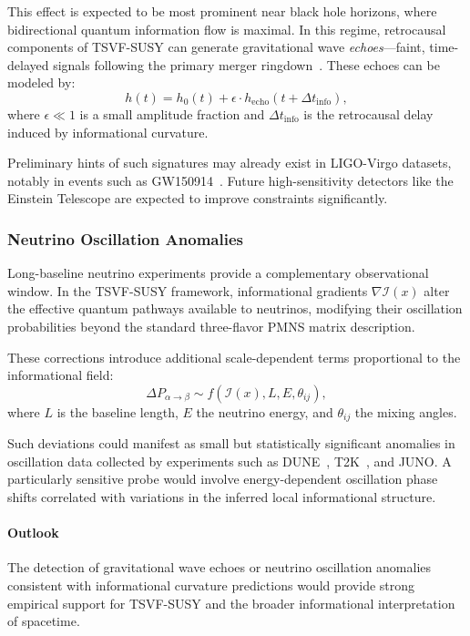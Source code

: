 \documentclass[twocolumn,superscriptaddress,floatfix]{revtex4-2}
\begin{document}
This effect is expected to be most prominent near black hole horizons, where bidirectional quantum information flow is maximal. In this regime, retrocausal components of TSVF-SUSY can generate gravitational wave \emph{echoes}—faint, time-delayed signals following the primary merger ringdown~\cite{Cardoso2016, Conklin2018}. These echoes can be modeled by:
\begin{equation}
h(t) = h_0(t) + \epsilon \cdot h_{\text{echo}}(t + \Delta t_{\text{info}}),
\label{eq:waveecho}
\end{equation}
where $\epsilon \ll 1$ is a small amplitude fraction and $\Delta t_{\text{info}}$ is the retrocausal delay induced by informational curvature.

Preliminary hints of such signatures may already exist in LIGO-Virgo datasets, notably in events such as GW150914~\cite{Abedi2017, Westerweck2018}. Future high-sensitivity detectors like the Einstein Telescope are expected to improve constraints significantly.

\subsubsection{Neutrino Oscillation Anomalies}

Long-baseline neutrino experiments provide a complementary observational window. In the TSVF-SUSY framework, informational gradients $\nabla \mathcal{I}(x)$ alter the effective quantum pathways available to neutrinos, modifying their oscillation probabilities beyond the standard three-flavor PMNS matrix description.

These corrections introduce additional scale-dependent terms proportional to the informational field:
\begin{equation}
\Delta P_{\alpha \rightarrow \beta} \sim f(\mathcal{I}(x), L, E, \theta_{ij}),
\end{equation}
where $L$ is the baseline length, $E$ the neutrino energy, and $\theta_{ij}$ the mixing angles.

Such deviations could manifest as small but statistically significant anomalies in oscillation data collected by experiments such as DUNE~\cite{DUNE2021}, T2K~\cite{T2K2020}, and JUNO. A particularly sensitive probe would involve energy-dependent oscillation phase shifts correlated with variations in the inferred local informational structure.

\paragraph{Outlook}  
The detection of gravitational wave echoes or neutrino oscillation anomalies consistent with informational curvature predictions would provide strong empirical support for TSVF-SUSY and the broader informational interpretation of spacetime.
\end{document}
